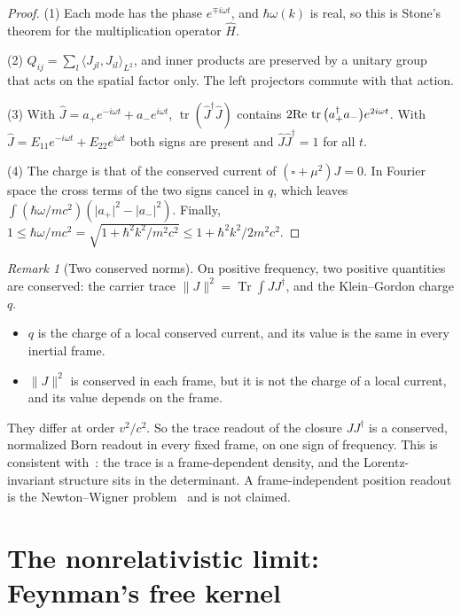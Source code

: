 \documentclass[11pt]{amsart}
\theoremstyle{definition}
\theoremstyle{remark}
\newtheorem{remark}[theorem]{Remark}
\newcommand{\tr}{\operatorname{tr}}
\newcommand{\Tr}{\operatorname{Tr}}
\begin{document}
\begin{proof}
(1) Each mode has the phase $e^{\mp i\omega t}$, and $\hbar\omega(k)$ is real, so this is Stone's theorem for the multiplication operator $\hat H$.

(2) $Q_{ij}=\sum_l\langle J_{jl},J_{il}\rangle_{L^2}$, and inner products are preserved by a unitary group that acts on the spatial factor only. The left projectors commute with that action.

(3) With $\hat J=a_+e^{-i\omega t}+a_-e^{i\omega t}$, $\tr(\hat J^\dagger\hat J)$ contains $2{\rm Re}\,\tr\big(a_+^\dagger a_-\big)e^{2i\omega t}$. With $\hat J=E_{11}e^{-i\omega t}+E_{22}e^{i\omega t}$ both signs are present and $\hat J\hat J^\dagger=1$ for all $t$.

(4) The charge is that of the conserved current of $(\square+\mu^2)J=0$. In Fourier space the cross terms of the two signs cancel in $q$, which leaves $\int(\hbar\omega/mc^2)(\lvert a_+\rvert^2-\lvert a_-\rvert^2)$. Finally, $1\le\hbar\omega/mc^2=\sqrt{1+\hbar^2k^2/m^2c^2}\le1+\hbar^2k^2/2m^2c^2$.
\end{proof}

\begin{remark}[Two conserved norms]\label{rem:twonorms}
On positive frequency, two positive quantities are conserved: the carrier trace $\lVert J\rVert^2=\Tr\int JJ^\dagger$, and the Klein--Gordon charge $q$.
\begin{itemize}
\item $q$ is the charge of a local conserved current, and its value is the same in every inertial frame.
\item $\lVert J\rVert^2$ is conserved in each frame, but it is not the charge of a local current, and its value depends on the frame.
\end{itemize}
They differ at order $v^2/c^2$. So the trace readout of the closure $JJ^\dagger$ is a conserved, normalized Born readout in every fixed frame, on one sign of frequency. This is consistent with~\cite[\S7.1]{Edge}: the trace is a frame-dependent density, and the Lorentz-invariant structure sits in the determinant. A frame-independent position readout is the Newton--Wigner problem~\cite{NW} and is not claimed.
\end{remark}

\section{The nonrelativistic limit: Feynman's free kernel}
\end{document}
